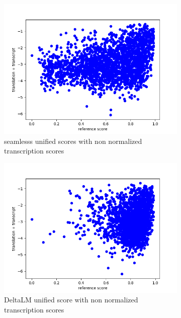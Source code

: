 \begin{figure}[ht]
    \centering
    \begin{subfigure}{0.4\textwidth}
        \includegraphics[width=\linewidth]{Latex/sections/images/seamlesstranscripttranslation.png}
        \caption{seamlesss unified scores with non normalized transcription scores}
    \end{subfigure}
    \begin{subfigure}{0.4\textwidth}
        \includegraphics[width=\linewidth]{Latex/sections/images/dlmtranscripttranslation.png}
        \caption{DeltaLM unified score with non normalized transcription scores}
    \end{subfigure}
    \begin{subfigure}{0.4\textwidth}

\end{subfigure}
\end{figure}
